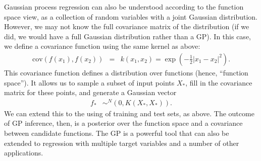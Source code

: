 \documentclass[12pt,letterpaper]{article}
\begin{document}
Gaussian process regression can also be understood according to the function space view, as a collection of random variables with a joint Gaussian distribution. However, we may not know the full covariance matrix of the distribution (if we did, we would have a full Gaussian distribution rather than a GP). In this case, we define a covariance function using the same kernel as above:
\begin{eqnarray*}
\text{cov}(f(x_1), f(x_2)) &=& k(x_1, x_2) = \exp(-\frac{1}{2} |x_1 - x_2|^2).
\end{eqnarray*}
This covariance function defines a distribution over functions (hence, ``function space''). It allows us to sample a subset of input points $X_*$, fill in the covariance matrix for these points, and generate a Gaussian vector
\begin{eqnarray*}
f_* &\sim^ N(0, K(X_*, X_*)).
\end{eqnarray*}
We can extend this to the using of training and test sets, as above. The outcome of GP inference, then, is a posterior over the function space and a covariance between candidate functions. The GP is a powerful tool that can also be extended to regression with multiple target variables and a number of other applications.
\end{document}
